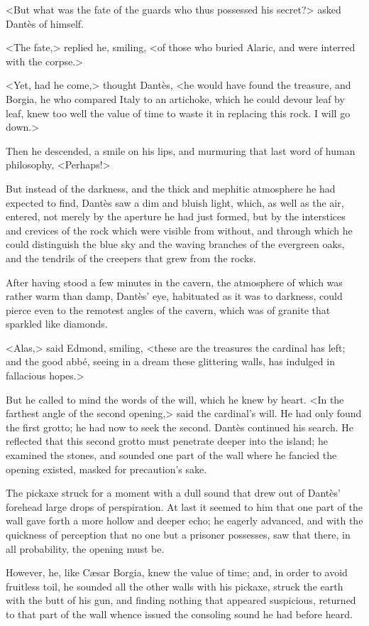 <But what was the fate of the guards who thus possessed his secret?> asked Dantès of himself. 

 <The fate,> replied he, smiling, <of those who buried Alaric, and were interred with the corpse.> 

 <Yet, had he come,> thought Dantès, <he would have found the treasure, and Borgia, he who compared Italy to an artichoke, which he could devour leaf by leaf, knew too well the value of time to waste it in replacing this rock. I will go down.> 

 Then he descended, a smile on his lips, and murmuring that last word of human philosophy, <Perhaps!> 

 But instead of the darkness, and the thick and mephitic atmosphere he had expected to find, Dantès saw a dim and bluish light, which, as well as the air, entered, not merely by the aperture he had just formed, but by the interstices and crevices of the rock which were visible from without, and through which he could distinguish the blue sky and the waving branches of the evergreen oaks, and the tendrils of the creepers that grew from the rocks. 

 After having stood a few minutes in the cavern, the atmosphere of which was rather warm than damp, Dantès' eye, habituated as it was to darkness, could pierce even to the remotest angles of the cavern, which was of granite that sparkled like diamonds. 

 <Alas,> said Edmond, smiling, <these are the treasures the cardinal has left; and the good abbé, seeing in a dream these glittering walls, has indulged in fallacious hopes.> 

 But he called to mind the words of the will, which he knew by heart. <In the farthest angle of the second opening,> said the cardinal's will. He had only found the first grotto; he had now to seek the second. Dantès continued his search. He reflected that this second grotto must penetrate deeper into the island; he examined the stones, and sounded one part of the wall where he fancied the opening existed, masked for precaution's sake. 

 The pickaxe struck for a moment with a dull sound that drew out of Dantès' forehead large drops of perspiration. At last it seemed to him that one part of the wall gave forth a more hollow and deeper echo; he eagerly advanced, and with the quickness of perception that no one but a prisoner possesses, saw that there, in all probability, the opening must be. 

 However, he, like Cæsar Borgia, knew the value of time; and, in order to avoid fruitless toil, he sounded all the other walls with his pickaxe, struck the earth with the butt of his gun, and finding nothing that appeared suspicious, returned to that part of the wall whence issued the consoling sound he had before heard. 

